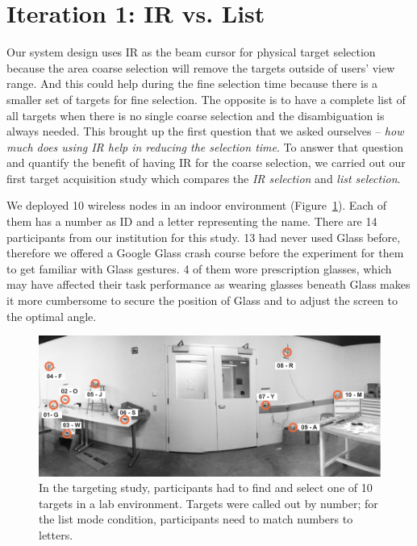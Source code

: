 
\section{Iteration 1: IR vs. List}
Our system design uses IR as the beam cursor for physical target selection because the area coarse selection will remove the targets outside of users' view range. And this could help during the fine selection time because there is a smaller set of targets for fine selection. The opposite is to have a complete list of all targets when there is no single coarse selection and the disambiguation is always needed. This brought up the first question that we asked ourselves -- {\em how much does using IR help in reducing the selection time}. To answer that question and quantify the benefit of having IR for the coarse selection, we carried out our first target acquisition study which compares the {\em IR selection} and {\em list selection}.  

We deployed 10 wireless nodes in an indoor environment (Figure~\ref{fig:targeting-study-layout}). Each of them has a number as ID and a letter representing the name. There are 14 participants from our institution for this study. 13 had never used Glass before, therefore we offered a Google Glass crash course before the experiment for them to get familiar with Glass gestures. 4 of them wore prescription glasses, which may have affected their task performance as wearing glasses beneath Glass makes it more cumbersome to secure the position of Glass and to adjust the screen to the optimal angle. 

\begin{figure}[t]
\centering
\includegraphics[width=1.0\columnwidth]{figures/targeting-study-layout.pdf}
\caption{In the targeting study, participants had to find and select one of 10 targets in a lab environment. Targets were called out by number; for the list mode condition, participants need to match numbers to letters.}
\label{fig:targeting-study-layout}
\end{figure}

